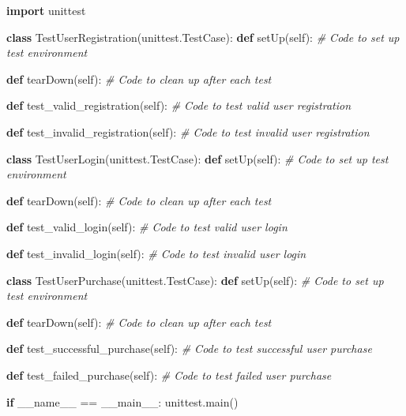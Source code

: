 \documentclass[
  paper=a4,
  ,captions=tableheading
]{scrartcl}
\newenvironment{Shaded}{}{}
\newcommand{\CommentTok}[1]{\textcolor[rgb]{0.38,0.63,0.69}{\textit{#1}}}
\newcommand{\ControlFlowTok}[1]{\textcolor[rgb]{0.00,0.44,0.13}{\textbf{#1}}}
\newcommand{\ImportTok}[1]{\textcolor[rgb]{0.00,0.50,0.00}{\textbf{#1}}}
\newcommand{\KeywordTok}[1]{\textcolor[rgb]{0.00,0.44,0.13}{\textbf{#1}}}
\newcommand{\NormalTok}[1]{#1}
\newcommand{\OperatorTok}[1]{\textcolor[rgb]{0.40,0.40,0.40}{#1}}
\newcommand{\StringTok}[1]{\textcolor[rgb]{0.25,0.44,0.63}{#1}}
\newcommand{\VariableTok}[1]{\textcolor[rgb]{0.10,0.09,0.49}{#1}}
\begin{document}
\begin{Shaded}
\begin{Highlighting}[]
\ImportTok{import}\NormalTok{ unittest}

\KeywordTok{class}\NormalTok{ TestUserRegistration(unittest.TestCase):}
    \KeywordTok{def}\NormalTok{ setUp(}\VariableTok{self}\NormalTok{):}
        \CommentTok{\# Code to set up test environment}

    \KeywordTok{def}\NormalTok{ tearDown(}\VariableTok{self}\NormalTok{):}
        \CommentTok{\# Code to clean up after each test}

    \KeywordTok{def}\NormalTok{ test\_valid\_registration(}\VariableTok{self}\NormalTok{):}
        \CommentTok{\# Code to test valid user registration}

    \KeywordTok{def}\NormalTok{ test\_invalid\_registration(}\VariableTok{self}\NormalTok{):}
        \CommentTok{\# Code to test invalid user registration}

\KeywordTok{class}\NormalTok{ TestUserLogin(unittest.TestCase):}
    \KeywordTok{def}\NormalTok{ setUp(}\VariableTok{self}\NormalTok{):}
        \CommentTok{\# Code to set up test environment}

    \KeywordTok{def}\NormalTok{ tearDown(}\VariableTok{self}\NormalTok{):}
        \CommentTok{\# Code to clean up after each test}

    \KeywordTok{def}\NormalTok{ test\_valid\_login(}\VariableTok{self}\NormalTok{):}
        \CommentTok{\# Code to test valid user login}

    \KeywordTok{def}\NormalTok{ test\_invalid\_login(}\VariableTok{self}\NormalTok{):}
        \CommentTok{\# Code to test invalid user login}

\KeywordTok{class}\NormalTok{ TestUserPurchase(unittest.TestCase):}
    \KeywordTok{def}\NormalTok{ setUp(}\VariableTok{self}\NormalTok{):}
        \CommentTok{\# Code to set up test environment}

    \KeywordTok{def}\NormalTok{ tearDown(}\VariableTok{self}\NormalTok{):}
        \CommentTok{\# Code to clean up after each test}

    \KeywordTok{def}\NormalTok{ test\_successful\_purchase(}\VariableTok{self}\NormalTok{):}
        \CommentTok{\# Code to test successful user purchase}

    \KeywordTok{def}\NormalTok{ test\_failed\_purchase(}\VariableTok{self}\NormalTok{):}
        \CommentTok{\# Code to test failed user purchase}

\ControlFlowTok{if} \VariableTok{\_\_name\_\_} \OperatorTok{==} \StringTok{\textquotesingle{}\_\_main\_\_\textquotesingle{}}\NormalTok{:}
\NormalTok{    unittest.main()}
\end{Highlighting}
\end{Shaded}
\end{document}
